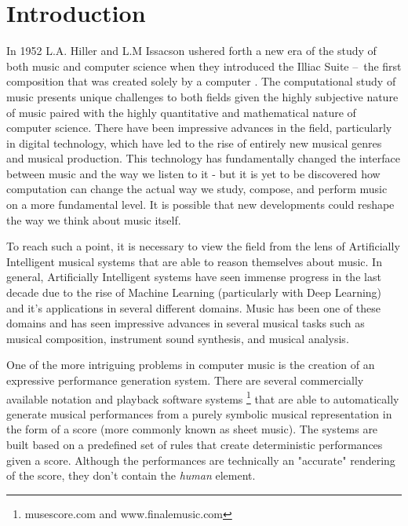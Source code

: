 
\chapter{Introduction}
In 1952 L.A. Hiller and L.M Issacson ushered forth a new era of the study of both music and computer science when they introduced the Illiac Suite – the first composition that was created solely by a computer \cite{sandred2009revisiting}. The computational study of music presents unique challenges to both fields given the highly subjective nature of music paired with the highly quantitative and mathematical nature of computer science. There have been impressive advances in the field, particularly in digital technology, which have led to the rise of entirely new musical genres and musical production. This technology has fundamentally changed the interface between music and the way we listen to it - but it is yet to be discovered how computation can change the actual way we study, compose, and perform music on a more fundamental level. It is possible that new developments could reshape the way we think about music itself. 

To reach such a point, it is necessary to view the field from the lens of Artificially Intelligent musical systems that are able to reason themselves about music. In general, Artificially Intelligent systems have seen immense progress in the last decade due to the rise of Machine Learning (particularly with Deep Learning) and it's applications in several different domains. Music has been one of these domains and has seen impressive advances in several musical tasks such as musical composition\cite{huang2018music}, instrument sound synthesis\cite{engel2017neural}, and musical analysis\cite{widmer2016getting}. 

One of the more intriguing problems in computer music is the creation of an expressive performance generation system. There are several commercially available notation and playback software systems \footnote{musescore.com and www.finalemusic.com} that are able to automatically generate musical performances from a purely symbolic musical representation in the form of a score (more commonly known as sheet music). The systems are built based on a predefined set of rules that create deterministic performances given a score. Although the performances are technically an "accurate" rendering of the score, they don't contain the \emph{human} element.

